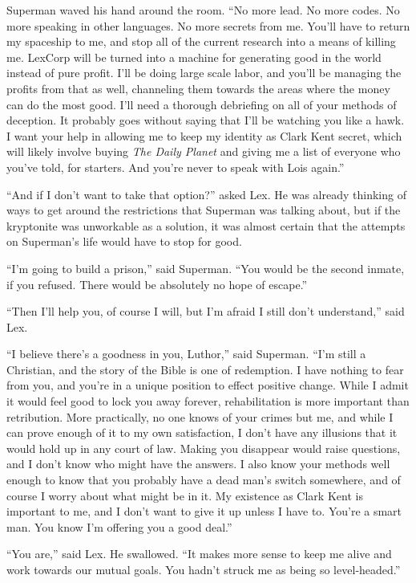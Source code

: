Superman waved his hand around the room. ``No more lead. No more codes.
No more speaking in other languages. No more secrets from me. You'll
have to return my spaceship to me, and stop all of the current research
into a means of killing me. LexCorp will be turned into a machine for
generating good in the world instead of pure profit. I'll be doing large
scale labor, and you'll be managing the profits from that as well,
channeling them towards the areas where the money can do the most good.
I'll need a thorough debriefing on all of your methods of deception. It
probably goes without saying that I'll be watching you like a hawk. I
want your help in allowing me to keep my identity as Clark Kent secret,
which will likely involve buying \emph{The Daily Planet} and giving me a
list of everyone who you've told, for starters. And you're never to
speak with Lois again.''

``And if I don't want to take that option?'' asked Lex. He was already
thinking of ways to get around the restrictions that Superman was
talking about, but if the kryptonite was unworkable as a solution, it
was almost certain that the attempts on Superman's life would have to
stop for good.

``I'm going to build a prison,'' said Superman. ``You would be the
second inmate, if you refused. There would be absolutely no hope of
escape.''

``Then I'll help you, of course I will, but I'm afraid I still don't
understand,'' said Lex.

``I believe there's a goodness in you, Luthor,'' said Superman. ``I'm
still a Christian, and the story of the Bible is one of redemption. I
have nothing to fear from you, and you're in a unique position to effect
positive change. While I admit it would feel good to lock you away
forever, rehabilitation is more important than retribution. More
practically, no one knows of your crimes but me, and while I can prove
enough of it to my own satisfaction, I don't have any illusions that it
would hold up in any court of law. Making you disappear would raise
questions, and I don't know who might have the answers. I also know your
methods well enough to know that you probably have a dead man's switch
somewhere, and of course I worry about what might be in it. My existence
as Clark Kent is important to me, and I don't want to give it up unless
I have to. You're a smart man. You know I'm offering you a good deal.''

``You are,'' said Lex. He swallowed. ``It makes more sense to keep me
alive and work towards our mutual goals. You hadn't struck me as being
so level‐headed.''

